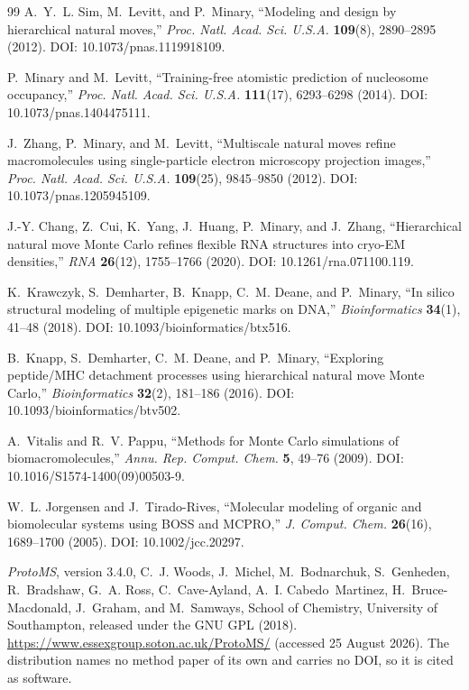 \begin{thebibliography}{99}
A.~Y.~L. Sim, M.~Levitt, and P.~Minary,
``Modeling and design by hierarchical natural moves,''
\emph{Proc. Natl. Acad. Sci. U.S.A.} \textbf{109}(8), 2890--2895 (2012).
DOI: 10.1073/pnas.1119918109.

P.~Minary and M.~Levitt,
``Training-free atomistic prediction of nucleosome occupancy,''
\emph{Proc. Natl. Acad. Sci. U.S.A.} \textbf{111}(17), 6293--6298 (2014).
DOI: 10.1073/pnas.1404475111.

J.~Zhang, P.~Minary, and M.~Levitt,
``Multiscale natural moves refine macromolecules using single-particle electron
microscopy projection images,''
\emph{Proc. Natl. Acad. Sci. U.S.A.} \textbf{109}(25), 9845--9850 (2012).
DOI: 10.1073/pnas.1205945109.

J.-Y. Chang, Z.~Cui, K.~Yang, J.~Huang, P.~Minary, and J.~Zhang,
``Hierarchical natural move Monte Carlo refines flexible RNA structures into
cryo-EM densities,''
\emph{RNA} \textbf{26}(12), 1755--1766 (2020).
DOI: 10.1261/rna.071100.119.

K.~Krawczyk, S.~Demharter, B.~Knapp, C.~M. Deane, and P.~Minary,
``In silico structural modeling of multiple epigenetic marks on DNA,''
\emph{Bioinformatics} \textbf{34}(1), 41--48 (2018).
DOI: 10.1093/bioinformatics/btx516.

B.~Knapp, S.~Demharter, C.~M. Deane, and P.~Minary,
``Exploring peptide/MHC detachment processes using hierarchical natural move
Monte Carlo,''
\emph{Bioinformatics} \textbf{32}(2), 181--186 (2016).
DOI: 10.1093/bioinformatics/btv502.

A.~Vitalis and R.~V. Pappu,
``Methods for Monte Carlo simulations of biomacromolecules,''
\emph{Annu. Rep. Comput. Chem.} \textbf{5}, 49--76 (2009).
DOI: 10.1016/S1574-1400(09)00503-9.

W.~L. Jorgensen and J.~Tirado-Rives,
``Molecular modeling of organic and biomolecular systems using BOSS and
MCPRO,''
\emph{J. Comput. Chem.} \textbf{26}(16), 1689--1700 (2005).
DOI: 10.1002/jcc.20297.

\emph{ProtoMS}, version 3.4.0, C.~J. Woods, J.~Michel, M.~Bodnarchuk,
S.~Genheden, R.~Bradshaw, G.~A. Ross, C.~Cave-Ayland, A.~I. Cabedo~Martinez,
H.~Bruce-Macdonald, J.~Graham, and M.~Samways, School of Chemistry, University
of Southampton, released under the GNU GPL (2018).
\url{https://www.essexgroup.soton.ac.uk/ProtoMS/} (accessed 25 August 2026).
The distribution names no method paper of its own and carries no DOI, so it is
cited as software.


\end{thebibliography}
